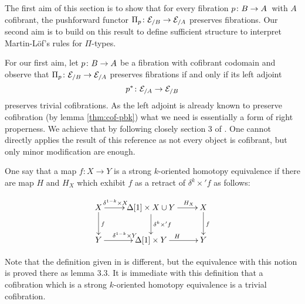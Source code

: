 \documentclass[reqno,10pt,a4paper,oneside,draft]{amsart}
\begin{document}
The first aim of this section is to show that for every fibration $p \colon B \to A$~with $A$ cofibrant, the pushforward functor $\Pi_p \colon \mathcal{E}_{/B} \to \mathcal{E}_{/A}$ 
preserves fibrations. Our second aim is to build on this result to define sufficient structure to interpret Martin-L\"of's rules for $\Pi$-types. 

\medskip

For our first aim, let $p \colon B \to A$ be a fibration with cofibrant codomain and observe that 
$\Pi_p \colon \mathcal{E}_{/B} \to \mathcal{E}_{/A}$  preserves fibrations if and only if its left adjoint 
\[
p^* \colon \mathcal{E}_{/A} \to \mathcal{E}_{/B}
\]
preserves trivial cofibrations. As the left adjoint is already known to preserve cofibration (by lemma \ref{thm:cof-pbk}) what we need is essentially a form of right properness. We achieve that by following closely section 3 of \cite{gambino2017frobenius}. One cannot directly applies the result of this reference as not every object is cofibrant, but only minor modification are enough.




\begin{definition}
One say that a map $f :X \rightarrow Y$ is a strong $k$-oriented homotopy equivalence if there are map $H$ and $H_X$ which exhibit $f$ as a retract of $\delta^k \times ' f$ as follows:

\[\xymatrix{X \ar[d]^{f} \ar[r]^{\hspace{-0.8cm}\delta^{1-k} \times X} & \Delta[1] \times X \cup Y \ar[d]^{\delta^k \times' f} \ar[r]^{\hspace{1cm}H_X} & X \ar[d]^{f} \\
Y \ar[r]^{\delta^{1-k} \times Y} & \Delta[1] \times Y \ar[r]^{H} & Y 
}\]


\end{definition}

Note that the definition given in \cite{gambino2017frobenius} is different, but the equivalence with this notion is proved there as lemma $3.3$. It is immediate with this definition that a cofibration which is a strong $k$-oriented homotopy equivalence is a trivial cofibration.
\end{document}
